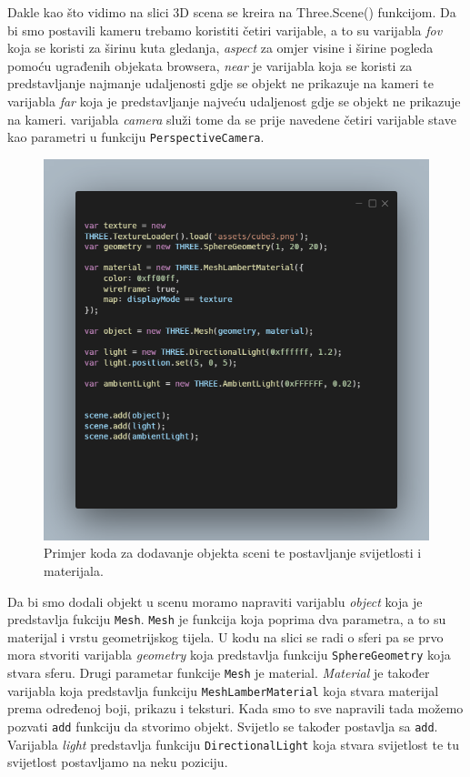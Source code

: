 \documentclass[a4paper,12pt]{article}
\begin{document}
Dakle kao što vidimo na slici 3D scena se kreira na Three.Scene() funkcijom. Da bi smo postavili kameru trebamo koristiti četiri varijable, a to su 
varijabla \textit{fov} koja se koristi za širinu kuta gledanja, \textit{aspect} za omjer visine i širine pogleda pomoću ugrađenih objekata browsera, \textit{near} je 
varijabla koja se koristi za predstavljanje najmanje udaljenosti gdje se objekt ne prikazuje na kameri te varijabla \textit{far} koja je predstavljanje najveću 
udaljenost gdje se objekt ne prikazuje na kameri.
varijabla \textit{camera} služi tome da se prije navedene četiri varijable stave kao parametri u funkciju \texttt{PerspectiveCamera}.

\begin{figure}[ht]
    \centering
    \includegraphics[scale=0.5]{image/zadatak1_objekti.png}
    \caption{Primjer koda za dodavanje objekta sceni te postavljanje svijetlosti i materijala.}
\end{figure}

\pagebreak
Da bi smo dodali objekt u scenu moramo napraviti varijablu \textit{object} koja je predstavlja fukciju \texttt{Mesh}. \texttt{Mesh} je funkcija koja poprima dva parametra, a to su materijal i 
vrstu geometrijskog tijela. U kodu na slici se radi o sferi pa se prvo mora stvoriti varijabla \textit{geometry} koja predstavlja funkciju \texttt{SphereGeometry} koja stvara sferu.
Drugi parametar funkcije \texttt{Mesh} je material. \textit{Material} je također varijabla koja predstavlja funkciju \texttt{MeshLamberMaterial} koja stvara materijal prema određenoj boji, 
prikazu i teksturi. Kada smo to sve napravili tada možemo pozvati \texttt{add} funkciju da stvorimo objekt. Svijetlo  se također postavlja sa \texttt{add}.
Varijabla \textit{light} predstavlja funkciju \texttt{DirectionalLight} koja stvara svijetlost te tu svijetlost postavljamo na neku poziciju. 
\end{document}
